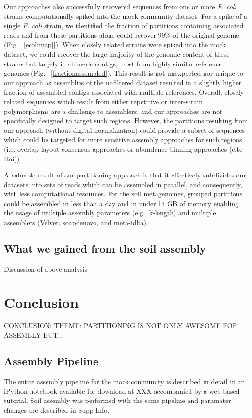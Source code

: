 \documentclass[11pt]{article} %
\begin{document}
Our approaches also successfully recovered sequences from one or more \emph{E. coli} strains computationally spiked into the mock community dataset.  For a spike of a single \emph{E. coli} strain, we identified the fraction of partitions containing associated reads and from these partitions alone could recover 99\% of the original genome (Fig. ~\ref{ecolimap|}).  When closely related strains were spiked into the mock dataset, we could recover the large majority of the genomic content of these strains but largely in chimeric contigs, most from highly similar reference genomes (Fig. ~\ref{fractionassembled}).  This result is not unexpected nor unique to our approach as assemblies of the unfiltered dataset resulted in a slightly higher fraction of assembled contigs associated with multiple references.  Overall, closely related sequences which result from either repetitive or inter-strain polymorphisms are a challenge to assemblers, and our approaches are not specifically designed to target such regions.  However, the partitions resulting from our approach (without digital normalization) could provide a subset of sequences which could be targeted for more sensitive assembly approaches for such regions (i.e. overlap-layout-consensus approaches or abundance binning approaches (cite Itai)).  

A valuable result of our partitioning approach is that it effectively subdivides our datasets into sets of reads which can be assembled in parallel, and consequently, with less computational resources.  For the soil metagenomes, grouped partitions could be assembled in less than a day and in under 14 GB of memory enabling the usage of multiple assembly parameters (e.g., k-length) and multiple assemblers (Velvet, soapdenovo, and meta-idba).

\subsection{What we gained from the soil assembly}

Discussion of above analysis

\section{Conclusion}
CONCLUSION:  
THEME: PARTITIONING IS NOT ONLY AWESOME FOR ASSEMBLY BUT...


\subsection{Assembly Pipeline}
The entire assembly pipeline for the mock community is described in detail in an iPython notebook available for download at XXX accompanied by a web-based tutorial.  Soil assembly was performed with the same pipeline and paramater changes are described in Supp Info.
\end{document}

